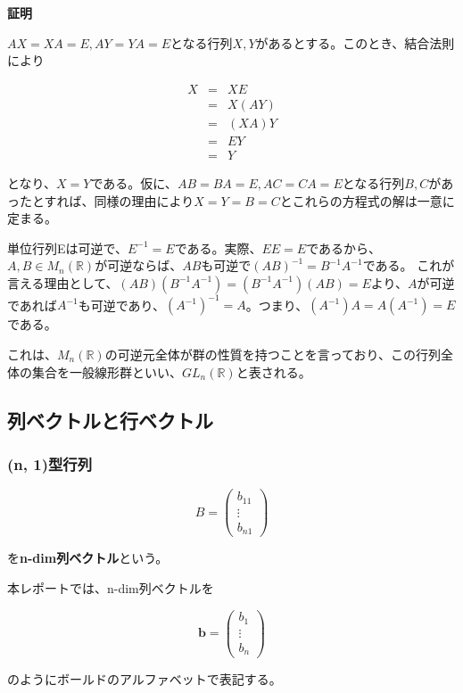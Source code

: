 \documentclass[dvipdfmx,autodetect-engine]{jsarticle}
\begin{document}
{\bf 証明}

$AX = XA = E, AY = YA = E$となる行列$X, Y$があるとする。このとき、結合法則により

\begin{eqnarray*}
X &= &XE \\
  &= &X(AY) \\
  &= &(XA)Y \\
  &= &EY \\
  &= &Y
\end{eqnarray*}

となり、$X = Y$である。仮に、$AB = BA = E, AC = CA = E$となる行列$B, C$があったとすれば、同様の理由により$X = Y = B = C$とこれらの方程式の解は一意に定まる。


単位行列Eは可逆で、$E^{-1} = E$である。実際、$EE = E$であるから、$A, B \in M_n(\mathbb{R})$が可逆ならば、$AB$も可逆で$(AB)^{-1} = B^{-1}A^{-1}$である。
これが言える理由として、$(AB)(B^{-1}A^{-1}) = (B^{-1}A^{-1})(AB) = E$より、$A$が可逆であれば$A^{-1}$も可逆であり、$(A^{-1})^{-1} = A$。つまり、$(A^{-1})A = A(A^{-1}) = E$である。

これは、$M_n(\mathbb{R})$の可逆元全体が群の性質を持つことを言っており、この行列全体の集合を一般線形群といい、$GL_n(\mathbb{R})$と表される。

\subsection{列ベクトルと行ベクトル}

\subsubsection{(n, 1)型行列}

$$
B = \begin{pmatrix}
b_{11} \\
\vdots \\
b_{n1}
\end{pmatrix}
$$

を{\bf n-dim列ベクトル}という。

本レポートでは、n-dim列ベクトルを

$$
\bm{b} = \begin{pmatrix}
b_1 \\
\vdots \\
b_n
\end{pmatrix}
$$

のようにボールドのアルファベットで表記する。
\end{document}
